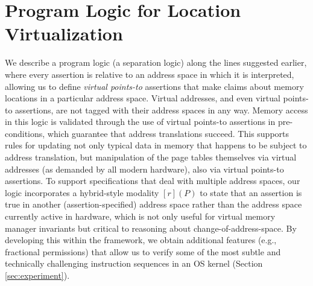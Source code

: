 \section{Program Logic for Location Virtualization}
\label{sec:logic}
\newcommand{\gammaPred}{\delta}
\newcommand{\gammaPreds}{\delta\textsf{s}}
\newcommand{\rtv}{\textsf{rtv}}
\newcommand{\qone}{\texttt{q1}}
\newcommand{\qtwo}{\texttt{q2}}
\newcommand{\qthree}{\texttt{q3}}
\newcommand{\qfour}{\texttt{q4}}

\newcommand{\sumwalkabs}[3]{
  \ownGhost\gammaPred{\authfrag{\singletonMap{#1}{(#2, #3)}}}
}

\newcommand{\sumapaces}[2]{
  \ownGhost\gammaPreds{\authfrag{\singletonMap{#1}{#2}}}
}
\newcommand{\ptableabswalk}[1]{\mathcal{A}\textsf{bsPTableWalk}(#1)}
\newcommand{\ptablestore}{\theta}

We describe a program logic (a separation logic) along the lines suggested earlier, where every assertion is relative
to an address space in which it is interpreted, allowing us to define \emph{virtual points-to} assertions that make claims
about memory locations in a particular address space. Virtual addresses, and even virtual points-to assertions, 
are not tagged with their address spaces in any way. Memory access in this logic is validated through the use 
of virtual points-to assertions in pre-conditions, which guarantee that address translations succeed.
This supports rules for updating not only typical data in memory that happens to be subject to address translation, but
manipulation of the page tables themselves via virtual addresses (as demanded by all modern hardware), also
via virtual points-to assertions.
To support specifications that deal with multiple address spaces, our logic incorporates a hybrid-style modality
$[r](P)$ to state that an assertion is true in another (assertion-specified) address space rather than the address space
currently active in hardware, which is not only useful for virtual memory manager invariants but critical to reasoning
about change-of-address-space.
By developing this within the \iris framework, we obtain additional features (e.g., fractional permissions) that allow us to verify
some of the most subtle and technically challenging instruction sequences in an OS kernel (Section \ref{sec:experiment}).

